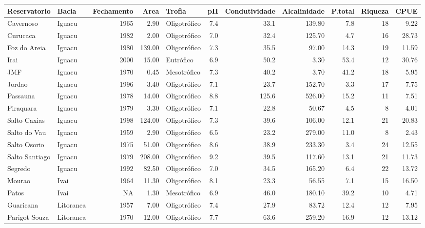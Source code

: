 \documentclass[
]{book}
\begin{document}
\begin{table}
\centering\begingroup\fontsize{8}{10}\selectfont

\begin{tabular}{llrrlrrrrrr}
\toprule
Reservatorio & Bacia & Fechamento & Area & Trofia & pH & Condutividade & Alcalinidade & P.total & Riqueza & CPUE\\
\midrule
Cavernoso & Iguacu & 1965 & 2.90 & Oligotrófico & 7.4 & 33.1 & 139.80 & 7.8 & 18 & 9.22\\
Curucaca & Iguacu & 1982 & 2.00 & Oligotrófico & 7.0 & 32.4 & 125.70 & 4.7 & 16 & 28.73\\
Foz do Areia & Iguacu & 1980 & 139.00 & Oligotrófico & 7.3 & 35.5 & 97.00 & 14.3 & 19 & 11.59\\
Irai & Iguacu & 2000 & 15.00 & Eutrófico & 6.9 & 50.2 & 3.30 & 53.4 & 12 & 30.76\\
JMF & Iguacu & 1970 & 0.45 & Mesotrófico & 7.3 & 40.2 & 3.70 & 41.2 & 18 & 5.95\\
\addlinespace
Jordao & Iguacu & 1996 & 3.40 & Oligotrófico & 7.1 & 23.7 & 152.70 & 3.3 & 17 & 7.75\\
Passauna & Iguacu & 1978 & 14.00 & Oligotrófico & 8.8 & 125.6 & 526.00 & 15.2 & 11 & 7.51\\
Piraquara & Iguacu & 1979 & 3.30 & Oligotrófico & 7.1 & 22.8 & 50.67 & 4.5 & 8 & 4.01\\
Salto Caxias & Iguacu & 1998 & 124.00 & Oligotrófico & 7.3 & 39.6 & 106.00 & 12.1 & 21 & 20.83\\
Salto do Vau & Iguacu & 1959 & 2.90 & Oligotrófico & 6.5 & 23.2 & 279.00 & 11.0 & 8 & 2.43\\
\addlinespace
Salto Osorio & Iguacu & 1975 & 51.00 & Oligotrófico & 8.6 & 38.9 & 233.30 & 3.4 & 24 & 12.55\\
Salto Santiago & Iguacu & 1979 & 208.00 & Oligotrófico & 9.2 & 39.5 & 117.60 & 13.1 & 21 & 11.73\\
Segredo & Iguacu & 1992 & 82.50 & Oligotrófico & 7.0 & 34.5 & 165.20 & 6.4 & 22 & 13.72\\
Mourao & Ivai & 1964 & 11.30 & Oligotrófico & 8.1 & 23.3 & 56.55 & 7.1 & 15 & 16.50\\
Patos & Ivai & NA & 1.30 & Mesotrófico & 6.9 & 46.0 & 180.10 & 39.2 & 10 & 4.71\\
\addlinespace
Guaricana & Litoranea & 1957 & 7.00 & Oligotrófico & 7.4 & 27.9 & 83.72 & 12.4 & 12 & 7.95\\
Parigot Souza & Litoranea & 1970 & 12.00 & Oligotrófico & 7.7 & 63.6 & 259.20 & 16.9 & 12 & 13.12\\

\end{tabular}
\end{table}
\end{document}
